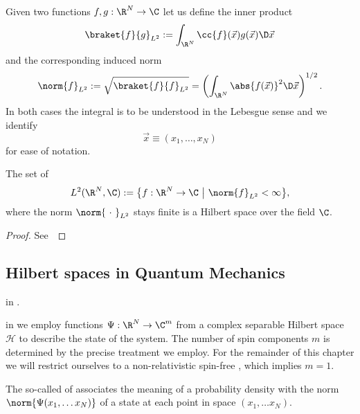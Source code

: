 \begin{prop}
	\label{prop:L2HilbertSpace}
	Given two functions $f, g : \R^N \to \C$
	let us define the inner product
	\begin{equation}
		\braket{f}{g}_{L^2} := \int_{\R^N} \cc{f}(\vec{x}) g(\vec{x}) \D \vec{x}
		\label{eqn:defL2InnProd}
	\end{equation}
	and the corresponding induced norm
	\begin{equation}
		\norm{f}_{L^2} := \sqrt{\braket{f}{f}_{L^2}} = \left( \int_{\R^N} \abs{f(\vec{x})}^2 \D \vec{x} \right)^{1/2}.
		\label{eqn:defL2Norm}
	\end{equation}
	In both cases the integral is to be understood in the Lebesgue sense
	and we identify
	\[ \vec{x} \equiv (x_1, \ldots, x_N) \]
	for ease of notation.

	The set of 
	\[ L^2(\R^N, \C) := \big\{ f : \R^N \to \C ~\big|~ \norm{f}_{L^2} < \infty \big\}, \]
	where the norm $\norm{~\cdot~}_{L^2}$ stays finite
	is a Hilbert space over the field $\C$.
	\begin{proof}
		See~\cite{Adams2003}
	\end{proof}
\end{prop}


\subsection{Hilbert spaces in Quantum Mechanics}





		
		in \QM.




		in \QM we employ functions $\Psi : \R^N \to \C^m$ from a
		complex separable Hilbert space $\mathcal{H}$
		to describe the state of the system.
		The number of spin components $m$ is determined by the precise
		\QM treatment we employ.
		For the remainder of this chapter we will restrict ourselves
		to a non-relativistic spin-free \QM, which implies $m=1$.




		The so-called  of \QM
		associates the meaning of a probability density
		with the norm $\norm{\Psi(x_1, \ldots x_N)}$
		of a state at each point in space $(x_1, \ldots x_N)$.
		
